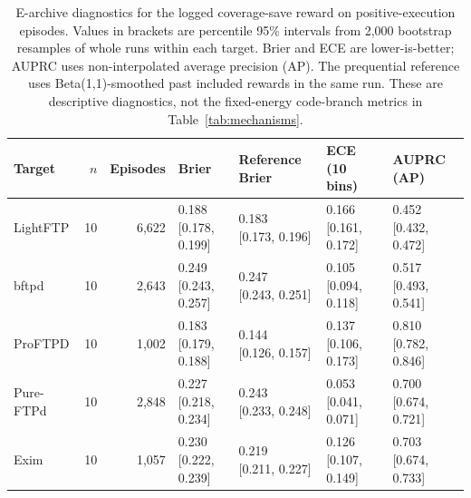 \begin{table}[t]
\centering\footnotesize
\caption{E-archive diagnostics for the logged coverage-save reward on positive-execution episodes. Values in brackets are percentile 95\% intervals from 2,000 bootstrap resamples of whole runs within each target. Brier and ECE are lower-is-better; AUPRC uses non-interpolated average precision (AP). The prequential reference uses Beta(1,1)-smoothed past included rewards in the same run. These are descriptive diagnostics, not the fixed-energy code-branch metrics in Table~\ref{tab:mechanisms}.}
\label{tab:logged_calibration}
\begin{tabularx}{\textwidth}{l r r *{4}{>{\centering\arraybackslash}X}}
\toprule
Target & $n$ & Episodes & Brier & Reference Brier & ECE (10 bins) & AUPRC (AP) \\
\midrule
LightFTP & 10 & 6,622 & \shortstack{0.188\\{[0.178, 0.199]}} & \shortstack{0.183\\{[0.173, 0.196]}} & \shortstack{0.166\\{[0.161, 0.172]}} & \shortstack{0.452\\{[0.432, 0.472]}} \\
bftpd & 10 & 2,643 & \shortstack{0.249\\{[0.243, 0.257]}} & \shortstack{0.247\\{[0.243, 0.251]}} & \shortstack{0.105\\{[0.094, 0.118]}} & \shortstack{0.517\\{[0.493, 0.541]}} \\
ProFTPD & 10 & 1,002 & \shortstack{0.183\\{[0.179, 0.188]}} & \shortstack{0.144\\{[0.126, 0.157]}} & \shortstack{0.137\\{[0.106, 0.173]}} & \shortstack{0.810\\{[0.782, 0.846]}} \\
Pure-FTPd & 10 & 2,848 & \shortstack{0.227\\{[0.218, 0.234]}} & \shortstack{0.243\\{[0.233, 0.248]}} & \shortstack{0.053\\{[0.041, 0.071]}} & \shortstack{0.700\\{[0.674, 0.721]}} \\
Exim & 10 & 1,057 & \shortstack{0.230\\{[0.222, 0.239]}} & \shortstack{0.219\\{[0.211, 0.227]}} & \shortstack{0.126\\{[0.107, 0.149]}} & \shortstack{0.703\\{[0.674, 0.733]}} \\

\end{tabularx}
\end{table}

